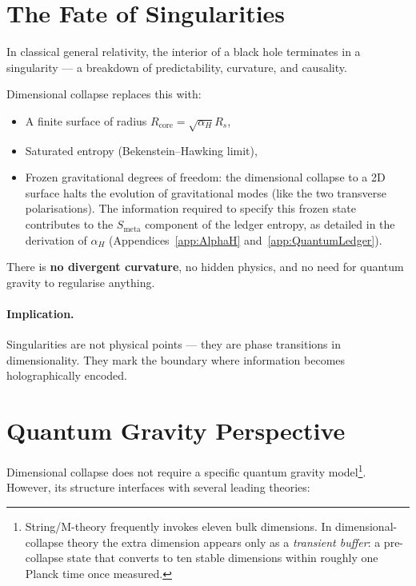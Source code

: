\documentclass[a4paper, 12pt, oneside]{book}
\numberwithin{equation}{chapter}
\begin{document}
\section{The Fate of Singularities}
\label{sec:Singularity}

In classical general relativity, the interior of a black hole terminates in a singularity —  
a breakdown of predictability, curvature, and causality.

Dimensional collapse replaces this with:

\begin{itemize}
  \item A finite surface of radius \( R_{\text{core}} = \sqrt{\alpha_H} R_s \),
  \item Saturated entropy (Bekenstein–Hawking limit),
  \item Frozen gravitational degrees of freedom: the dimensional collapse to a 2D surface halts the evolution of gravitational modes (like the two transverse polarisations). The information required to specify this frozen state contributes to the $S_{\text{meta}}$ component of the ledger entropy, as detailed in the derivation of $\alpha_H$ (Appendices~\ref{app:AlphaH} and~\ref{app:QuantumLedger}).
\end{itemize}

There is \textbf{no divergent curvature}, no hidden physics, and no need for quantum gravity to regularise anything.

\paragraph{Implication.}
Singularities are not physical points — they are phase transitions in dimensionality.  
They mark the boundary where information becomes holographically encoded.

\section{Quantum Gravity Perspective}
\label{sec:QuantumGravity}

Dimensional collapse does not require a specific quantum gravity model\footnote{%
String/M-theory frequently invokes eleven bulk dimensions.
In dimensional-collapse theory the extra dimension appears only as a \emph{transient buffer}:
a pre-collapse state that converts to ten stable dimensions within roughly one Planck time once measured.}.
However, its structure interfaces with several leading theories:
\end{document}
